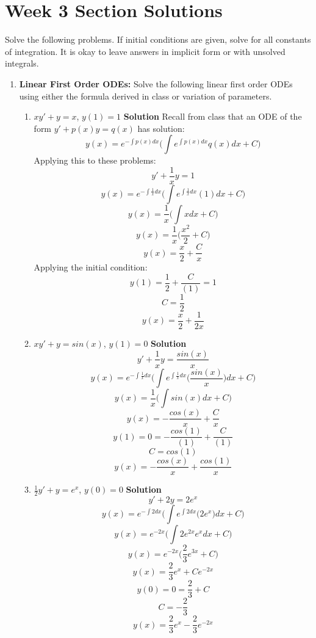 \documentclass[letterpaper, fontsize=11pt]{scrartcl} %
\numberwithin{equation}{section} %
\numberwithin{figure}{section} %
\numberwithin{table}{section} %
\begin{document}

\newcommand{\horrule}[1]{\rule{\linewidth}{#1}} %


\section*{Week 3 Section Solutions}
\par Solve the following problems. If initial conditions are given, solve for all constants of integration. It is okay to leave answers in implicit form or with unsolved integrals. 

\begin{enumerate}
\item \textbf{Linear First Order ODEs:} Solve the following linear first order ODEs using either the formula derived in class or variation of parameters. 
\begin{enumerate}
\item $xy' + y = x$, $y(1) = 1$ \newline
\textbf{Solution} \newline
Recall from class that an ODE of the form $y' + p(x)y = q(x)$ has solution: $$y(x) = e^{-\int p(x) dx}\bigg (\int e^{\int p(x) dx} q(x) dx + C \bigg)$$
Applying this to these problems:
$$y' + \frac{1}{x} y = 1$$
$$y(x) = e^{-\int \frac{1}{x} dx}\bigg (\int e^{\int \frac{1}{x} dx} (1) dx + C \bigg)$$
$$y(x) = \frac{1}{x} \bigg (\int x dx + C \bigg)$$
$$y(x) = \frac{1}{x} \big(\frac{x^2}{2} + C\big)$$
$$y(x) = \frac{x}{2} + \frac{C}{x}$$
Applying the initial condition:
$$y(1) = \frac{1}{2} + \frac{C}{(1)} = 1$$
$$ C = \frac{1}{2}$$
$$y(x) = \frac{x}{2} + \frac{1}{2x}$$

\item $xy' + y = sin(x)$, $y(1) = 0$ \newline
\textbf{Solution} \newline
$$y' + \frac{1}{x}y = \frac{sin(x)}{x}$$
$$y(x) = e^{-\int \frac{1}{x} dx}\bigg (\int e^{\int \frac{1}{x} dx} \big(\frac{sin(x)}{x}\big) dx + C \bigg)$$
$$y(x) = \frac{1}{x} \bigg (\int  sin(x) dx + C \bigg)$$
$$y(x) = -\frac{cos(x)}{x} + \frac{C}{x} $$
$$y(1) = 0 = -\frac{cos(1)}{(1)} + \frac{C}{(1)}$$
$$ C = cos(1)$$
$$ y(x) = -\frac{cos(x)}{x} + \frac{cos(1)}{x} $$


\item $\frac{1}{2} y' + y = e^x$, $y(0) = 0$ \newline
\textbf{Solution} \newline
$$y' + 2y = 2e^x$$
$$y(x) = e^{-\int 2 dx}\bigg (\int e^{\int 2 dx} \big(2e^x\big) dx + C \bigg)$$
$$y(x) = e^{-2x}\bigg (\int 2e^{2x} e^x dx + C \bigg)$$
$$y(x) = e^{-2x}\bigg (\frac{2}{3}e^{3x} + C \bigg)$$
$$y(x) = \frac{2}{3}e^{x} + Ce^{-2x}$$
$$y(0) = 0 = \frac{2}{3} + C$$
$$C = -\frac{2}{3}$$
$$y(x) = \frac{2}{3}e^{x} - \frac{2}{3}e^{-2x}$$


\end{enumerate}
\end{enumerate}
\end{document}
